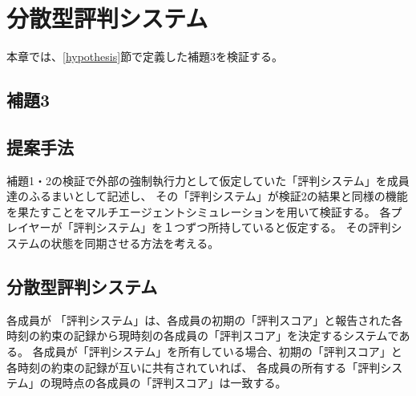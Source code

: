 \chapter{分散型評判システム}
本章では、\ref{hypothesis}節で定義した補題3を検証する。


\section{補題3}
\thirdLemma

\section{提案手法}
補題1・2の検証で外部の強制執行力として仮定していた「評判システム」を成員達のふるまいとして記述し、
その「評判システム」が検証2の結果と同様の機能を果たすことをマルチエージェントシミュレーションを用いて検証する。
各プレイヤーが「評判システム」を１つずつ所持していると仮定する。
その評判システムの状態を同期させる方法を考える。


\section{分散型評判システム}
各成員が
「評判システム」は、各成員の初期の「評判スコア」と報告された各時刻の約束の記録から現時刻の各成員の「評判スコア」を決定するシステムである。
各成員が「評判システム」を所有している場合、初期の「評判スコア」と各時刻の約束の記録が互いに共有されていれば、
各成員の所有する「評判システム」の現時点の各成員の「評判スコア」は一致する。




